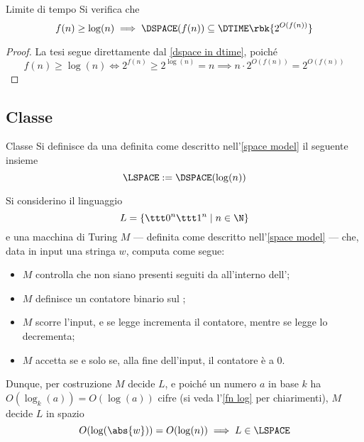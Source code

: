 \documentclass[a4paper, 12pt]{report}
\begin{document}
    \begin{framedcor}[label={dspace in dtime cor}]{Limite di tempo}
        Si verifica che $$f(n) \ge \log(n) \implies \DSPACE(f(n)) \subseteq \DTIME \rbk{2^{O(f(n))}}$$
    \end{framedcor}

    \begin{proof}
        La tesi segue direttamente dal \cref{dspace in dtime}, poiché $$f(n) \ge \log(n) \iff 2^{f(n)} \ge 2^{\log(n)} = n \implies n \cdot 2^{O(f(n))} = 2^{O(f(n))}$$
    \end{proof}

    \subsection{Classe \LSPACE}

    \begin{frameddefn}{Classe \LSPACE}
        Si definisce  da una \TM definita come descritto nell'\cref{space model} il seguente insieme $$\LSPACE := \displaystyle \DSPACE(\log(n))$$
    \end{frameddefn}

    \begin{example}
        Si considerino il linguaggio $$L = \{\ttt 0 ^n \ttt 1 ^n \mid n \in \N\}$$ e una macchina di Turing $M$ --- definita come descritto nell'\cref{space model} --- che, data in input una stringa $w$, computa come segue:

        \begin{itemize}
            \item $M$ controlla che non siano presenti  seguiti da  all'interno dell';
            \item $M$ definisce un contatore binario sul ;
            \item $M$ scorre l'input, e se legge  incrementa il contatore, mentre se legge  lo decrementa;
            \item $M$ accetta se e solo se, alla fine dell'input, il contatore è a 0.
        \end{itemize}

        Dunque, per costruzione $M$ decide $L$, e poiché un numero $a$ in base $k$ ha $O(\log_k(a)) = O(\log(a))$ cifre (si veda l'\cref{fn log} per chiarimenti), $M$ decide $L$ in spazio $$O(\log(\abs{w})) = O(\log(n)) \implies L \in \LSPACE$$
    \end{example}
\end{document}
